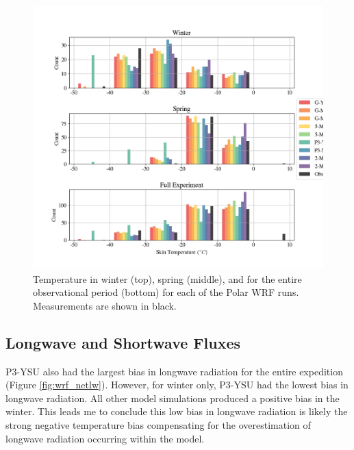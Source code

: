 \begin{figure}[H]
    \centering
    \includegraphics[width=1\linewidth]{figures/chapter3/WRF_TSK_Histo.png}
    \caption[Polar WRF simulation temperature histograms]{Temperature in winter (top), spring (middle), and for the entire observational period (bottom) for each of the Polar WRF runs. Measurements are shown in black.}
    \label{fig:wrf_tsk}
\end{figure}

\subsection{Longwave and Shortwave Fluxes}
 P3-YSU also had the largest bias in longwave radiation for the entire expedition (Figure \ref{fig:wrf_netlw}). However, for winter only, P3-YSU had the lowest bias in longwave radiation. All other model simulations produced a positive bias in the winter. This leads me to conclude this low bias in longwave radiation is likely the strong negative temperature bias compensating for the overestimation of longwave radiation occurring within the model. 

